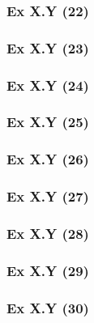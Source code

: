 \subsubsection{Ex X.Y (22)}\label{sec:Ex_X.Y.22}
\subsubsection{Ex X.Y (23)}\label{sec:Ex_X.Y.23}
\subsubsection{Ex X.Y (24)}\label{sec:Ex_X.Y.24}
\subsubsection{Ex X.Y (25)}\label{sec:Ex_X.Y.25}
\subsubsection{Ex X.Y (26)}\label{sec:Ex_X.Y.26}
\subsubsection{Ex X.Y (27)}\label{sec:Ex_X.Y.27}
\subsubsection{Ex X.Y (28)}\label{sec:Ex_X.Y.28}
\subsubsection{Ex X.Y (29)}\label{sec:Ex_X.Y.29}
\subsubsection{Ex X.Y (30)}\label{sec:Ex_X.Y.30}

\newpage		%
%
